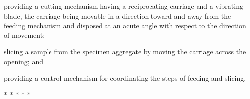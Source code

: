 \documentclass{article}
\begin{document}
\begin{hangpars}
\hspace*{1.5em}providing a cutting mechanism having a reciprocating carriage and a vibrating blade, the carriage being movable in a direction toward and away from the feeding mechanism and disposed at an acute angle with respect to the direction of movement;

\hspace*{1.5em}slicing a sample from the specimen aggregate by moving the carriage across the opening; and

\hspace*{1.5em}providing a control mechanism for coordinating the steps of feeding and slicing.

\end{hangpars}
\begin{center}* * * * *\end{center}
\end{document}
